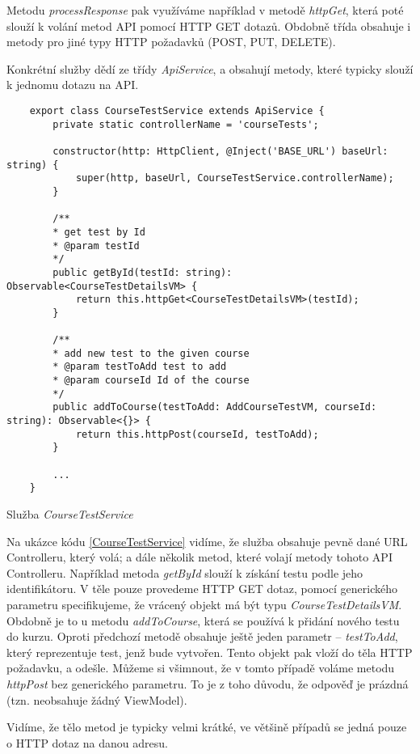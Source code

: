 Metodu \textit{processResponse} pak využíváme například v metodě \textit{httpGet}, která poté slouží k volání metod API pomocí HTTP GET dotazů. Obdobně třída obsahuje i metody pro jiné typy HTTP požadavků (POST, PUT, DELETE).

Konkrétní služby dědí ze třídy \textit{ApiService}, a obsahují metody, které typicky slouží k jednomu dotazu na API.

\begin{program}
	\begin{lstlisting}
	export class CourseTestService extends ApiService {
		private static controllerName = 'courseTests';
		
		constructor(http: HttpClient, @Inject('BASE_URL') baseUrl: string) {
			super(http, baseUrl, CourseTestService.controllerName);
		}
		
		/**
		* get test by Id
		* @param testId
		*/
		public getById(testId: string): Observable<CourseTestDetailsVM> {
			return this.httpGet<CourseTestDetailsVM>(testId);
		}
		
		/**
		* add new test to the given course
		* @param testToAdd test to add
		* @param courseId Id of the course
		*/
		public addToCourse(testToAdd: AddCourseTestVM, courseId: string): Observable<{}> {
			return this.httpPost(courseId, testToAdd);
		}
		
		...
	}
	\end{lstlisting}
	\caption{Služba \textit{CourseTestService}}
	\label{CourseTestService}
\end{program}

Na ukázce kódu \ref{CourseTestService} vidíme, že služba obsahuje pevně dané URL Controlleru, který volá; a dále několik metod, které volají metody tohoto API Controlleru.
Například metoda \textit{getById} slouží k získání testu podle jeho identifikátoru. V těle pouze provedeme HTTP GET dotaz, pomocí generického parametru specifikujeme, že vrácený objekt má být typu \textit{CourseTestDetailsVM}. 
Obdobně je to u metodu \textit{addToCourse}, která se používá k přidání nového testu do kurzu. Oproti předchozí metodě obsahuje ještě jeden parametr -- \textit{testToAdd}, který reprezentuje test, jenž bude vytvořen. Tento objekt pak vloží do těla HTTP požadavku, a odešle. 
Můžeme si všimnout, že v tomto případě voláme metodu \textit{httpPost} bez generického parametru. To je z toho důvodu, že odpověď je prázdná (tzn. neobsahuje žádný ViewModel).

Vidíme, že tělo metod je typicky velmi krátké, ve většině případů se jedná pouze o HTTP dotaz na danou adresu.

